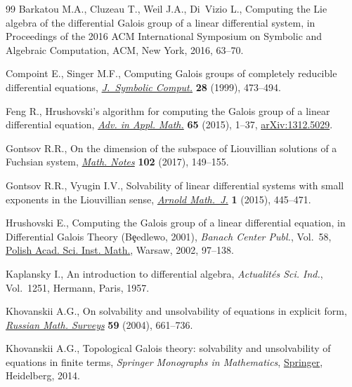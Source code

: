 \documentclass[11pt]{article}
\numberwithin{equation}{section}
\let\SourceCedilla\c
\renewcommand{\c}[1]{{\AccentFallback\SourceCedilla{#1}}}
\begin{document}
\begin{thebibliography}{99}
Barkatou M.A., Cluzeau T., Weil J.A., Di~Vizio L., Computing the {L}ie algebra
 of the differential {G}alois group of a linear differential system, in
 Proceedings of the 2016 {ACM} {I}nternational {S}ymposium on {S}ymbolic and
 {A}lgebraic {C}omputation, ACM, New York, 2016, 63--70.

Compoint E., Singer M.F., Computing {G}alois groups of completely reducible
 differential equations, \href{https://doi.org/10.1006/jsco.1999.0311}{\textit{J.~Symbolic Comput.}} \textbf{28} (1999),
 473--494.

Feng R., Hrushovski's algorithm for computing the {G}alois group of a linear
 differential equation, \href{https://doi.org/10.1016/j.aam.2015.01.001}{\textit{Adv. in Appl. Math.}} \textbf{65} (2015),
 1--37, \href{https://arxiv.org/abs/1312.5029}{arXiv:1312.5029}.

Gontsov R.R., On the dimension of the subspace of {L}iouvillian solutions of a
 {F}uchsian system, \href{https://doi.org/10.1134/S0001434617070173}{\textit{Math. Notes}} \textbf{102} (2017), 149--155.

Gontsov R.R., Vyugin I.V., Solvability of linear differential systems with
 small exponents in the {L}iouvillian sense, \href{https://doi.org/10.1007/s40598-015-0032-4}{\textit{Arnold Math.~J.}}
 \textbf{1} (2015), 445--471.

Hrushovski E., Computing the {G}alois group of a linear differential equation,
 in Differential {G}alois Theory ({B}\c{e}edlewo, 2001), \textit{Banach Center
 Publ.}, Vol.~58, \href{https://doi.org/10.4064/bc58-0-9}{Polish Acad. Sci. Inst. Math.}, Warsaw, 2002, 97--138.

Kaplansky I., An introduction to differential algebra, \textit{Actualit\'{e}s
 Sci. Ind.}, Vol.~1251, Hermann, Paris, 1957.

Khovanskii A.G., On solvability and unsolvability of equations in explicit
 form, \href{https://doi.org/10.1070/RM2004v059n04ABEH000759}{\textit{Russian Math. Surveys}} \textbf{59} (2004), 661--736.

Khovanskii A.G., Topological {G}alois theory: solvability and unsolvability of
 equations in finite terms, \textit{Springer Monographs in Mathematics}, \href{https://doi.org/10.1007/978-3-642-38871-2}{Springer},
 Heidelberg, 2014.


\end{thebibliography}
\end{document}
